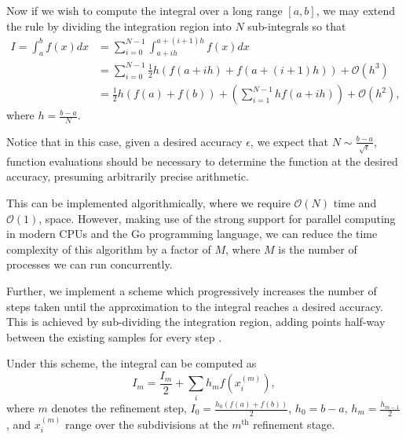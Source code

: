 \documentclass[10pt, a4paper]{article}
\begin{document}

  Now if we wish to compute the integral over a long range $[a, b]$, we may extend the rule by dividing
  the integration region into $N$ sub-integrals so that
  \begin{equation}
  \begin{split}
  I = \int_a^b f(x) dx & = \sum_{i=0}^{N-1} \int_{a+ih}^{a+(i+1)h} f(x) dx \\
  & = \sum_{i=0}^{N-1} \frac{1}{2} h (f(a+ih) + f(a+(i+1)h)) + \mathcal{O}(h^3) \\
  & = \frac{1}{2} h (f(a) + f(b)) + \left( \sum_{i=1}^{N-1} h f(a+ih) \right) + \mathcal{O}(h^2),
  \end{split}
  \end{equation}
  where $h = \frac{b-a}{N}$.

  Notice that in this case, given a desired accuracy $\epsilon$, we expect that $N \sim \frac{b-a}{\sqrt{\epsilon}}$,
  function evaluations should be necessary to determine the function at the desired accuracy, presuming
  arbitrarily precise arithmetic.

  This can be implemented algorithmically, where we require $\mathcal{O}(N)$ time and $\mathcal{O}(1)$,
  space. However, making use of the strong support for parallel computing in modern CPUs and the Go
  programming language, we can reduce the time complexity of this algorithm by a factor of $M$, where $M$
  is the number of processes we can run concurrently\footnotemark.


  Further, we implement a scheme which progressively increases the number of steps taken until the
  approximation to the integral reaches a desired accuracy. This is achieved by sub-dividing
  the integration region, adding points half-way between the existing samples for every step \cite{nr}.

  Under this scheme, the integral can be computed as
  \begin{equation}
  \label{eq:trap-rec}
  I_m = \frac{I_m}{2} + \sum_i h_m f(x^{(m)}_i),
  \end{equation}
  where $m$ denotes the refinement step, $I_0 = \frac{h_0 (f(a) + f(b))}{2}$, $h_0 = b-a$,
  $h_m = \frac{h_{m-1}}{2}$, and $x^{(m)}_i$
  range over the subdivisions at the $m^{\text{th}}$ refinement stage.
\end{document}
